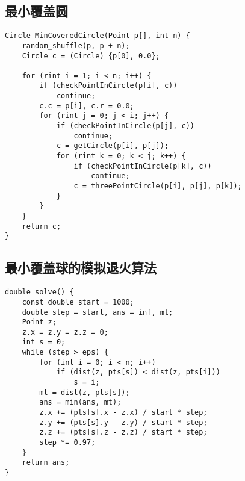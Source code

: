 \subsection{最小覆盖圆}
\begin{verbatim}
Circle MinCoveredCircle(Point p[], int n) {
    random_shuffle(p, p + n);
    Circle c = (Circle) {p[0], 0.0};

    for (rint i = 1; i < n; i++) {
        if (checkPointInCircle(p[i], c))
            continue;
        c.c = p[i], c.r = 0.0;
        for (rint j = 0; j < i; j++) {
            if (checkPointInCircle(p[j], c))
                continue;
            c = getCircle(p[i], p[j]);
            for (rint k = 0; k < j; k++) {
                if (checkPointInCircle(p[k], c))
                    continue;
                c = threePointCircle(p[i], p[j], p[k]);
            }
        }
    }
    return c;
}
\end{verbatim}


\subsection{最小覆盖球的模拟退火算法}
\begin{verbatim}
double solve() {
    const double start = 1000;
    double step = start, ans = inf, mt;
    Point z;
    z.x = z.y = z.z = 0;
    int s = 0;
    while (step > eps) {
        for (int i = 0; i < n; i++)
            if (dist(z, pts[s]) < dist(z, pts[i]))
                s = i;
        mt = dist(z, pts[s]);
        ans = min(ans, mt);
        z.x += (pts[s].x - z.x) / start * step;
        z.y += (pts[s].y - z.y) / start * step;
        z.z += (pts[s].z - z.z) / start * step;
        step *= 0.97; 
    }
    return ans;
}
\end{verbatim}